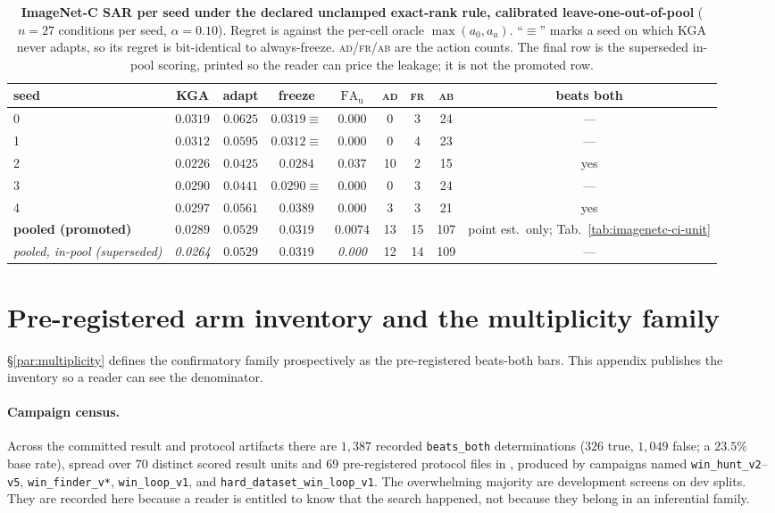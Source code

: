 \begin{table}[t]\centering\footnotesize
\caption{\textbf{ImageNet-C SAR per seed under the declared unclamped exact-rank rule, calibrated
leave-one-out-of-pool} ($n{=}27$ conditions per seed, $\alpha{=}0.10$). Regret is against the
per-cell oracle $\max(a_0,a_a)$. ``$\equiv$'' marks a seed on which \textsc{KGA} never adapts, so its
regret is bit-identical to always-freeze. \textsc{ad}/\textsc{fr}/\textsc{ab} are the action counts.
The final row is the superseded in-pool scoring, printed so the reader can price the leakage; it is
not the promoted row.}
\label{tab:imagenetc-perseed}
\begin{tabular}{lcccccccc}
\toprule
seed & \textsc{KGA} & adapt & freeze & $\mathrm{FA}_{\mathrm u}$
& \textsc{ad} & \textsc{fr} & \textsc{ab} & beats both \\
\midrule
0 & $0.0319$ & $0.0625$ & $0.0319$\;$\equiv$ & $0.000$ & 0 & 3 & 24 & --- \\
1 & $0.0312$ & $0.0595$ & $0.0312$\;$\equiv$ & $0.000$ & 0 & 4 & 23 & --- \\
2 & $0.0226$ & $0.0425$ & $0.0284$ & $0.037$ & 10 & 2 & 15 & yes \\
3 & $0.0290$ & $0.0441$ & $0.0290$\;$\equiv$ & $0.000$ & 0 & 3 & 24 & --- \\
4 & $0.0297$ & $0.0561$ & $0.0389$ & $0.000$ & 3 & 3 & 21 & yes \\
\midrule
\textbf{pooled (promoted)} & $\mathbf{0.0289}$ & $0.0529$ & $0.0319$ & $\mathbf{0.0074}$ & 13 & 15 & 107 & point est.\ only; Tab.~\ref{tab:imagenetc-ci-unit} \\
\midrule
\emph{pooled, in-pool (superseded)} & \emph{0.0264} & $0.0529$ & $0.0319$ & \emph{0.000} & 12 & 14 & 109 & --- \\
\bottomrule
\end{tabular}
\end{table}

\section{Pre-registered arm inventory and the multiplicity family}\label{app:arm-inventory}
\S\ref{par:multiplicity} defines the confirmatory family prospectively as the pre-registered
beats-both bars. This appendix publishes the inventory so a reader can see the denominator.

\paragraph{Campaign census.} Across the committed result and protocol artifacts there are
$1{,}387$ recorded \texttt{beats\_both} determinations ($326$ true, $1{,}049$ false; a $23.5\%$ base
rate), spread over $70$ distinct scored result units and $69$ pre-registered protocol files in
, produced by campaigns named \texttt{win\_hunt\_v2}--\texttt{v5},
\texttt{win\_finder\_v*}, \texttt{win\_loop\_v1}, and \texttt{hard\_dataset\_win\_loop\_v1}. The
overwhelming majority are development screens on dev splits. They are recorded here because a
reader is entitled to know that the search happened, not because they belong in an inferential
family.

